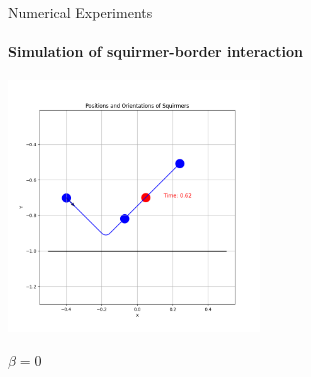 \documentclass{beamer}
\begin{document}
\begin{frame}{Numerical Experiments}
    \framesubtitle{Simulation of squirmer-border interaction}
    \centering
    \includegraphics[width=0.5\textwidth]{../../graphs/simulations/border/beta0/mpi_4.png}
    \begin{center}
        $\beta = 0$
    \end{center}
\end{frame}
\end{document}
